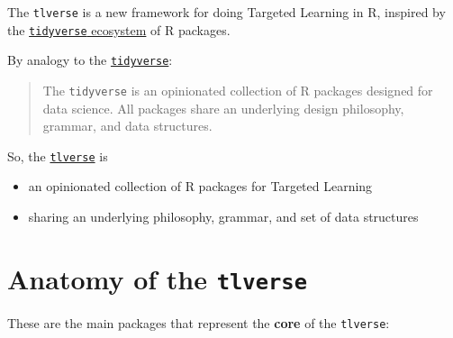 \documentclass[12pt, krantz2,]{krantz}
\newcommand{\passthrough}[1]{#1}
\providecommand{\tightlist}{%
  \setlength{\itemsep}{0pt}\setlength{\parskip}{0pt}}
\theoremstyle{definition}
\theoremstyle{definition}
\theoremstyle{definition}
\newcommand{\1}{\mathbbm{1}}
\begin{document}
The \passthrough{\lstinline!tlverse!} is a new framework for doing Targeted Learning in R, inspired by
the \href{https://tidyverse.org}{\passthrough{\lstinline!tidyverse!} ecosystem} of R packages.

By analogy to the \href{https://tidyverse.org/}{\passthrough{\lstinline!tidyverse!}}:

\begin{quote}
The \passthrough{\lstinline!tidyverse!} is an opinionated collection of R packages designed for data
science. All packages share an underlying design philosophy, grammar, and data
structures.
\end{quote}

So, the \href{https://tlverse.org}{\passthrough{\lstinline!tlverse!}} is

\begin{itemize}
\tightlist
\item
  an opinionated collection of R packages for Targeted Learning
\item
  sharing an underlying philosophy, grammar, and set of data structures
\end{itemize}

\hypertarget{anatomy-of-the-tlverse}{%
\section*{\texorpdfstring{Anatomy of the \texttt{tlverse}}{Anatomy of the tlverse}}\label{anatomy-of-the-tlverse}}


These are the main packages that represent the \textbf{core} of the \passthrough{\lstinline!tlverse!}:
\end{document}
